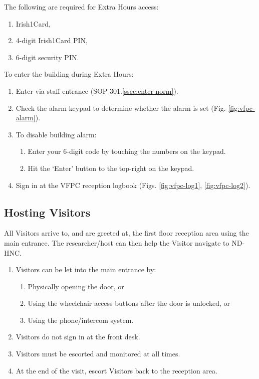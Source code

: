 \documentclass[11pt]{article}
\begin{document}
The following are required for Extra Hours access:

\begin{enumerate}
	\item Irish1Card,
	\item 4-digit Irish1Card PIN,
	\item 6-digit security PIN.
\end{enumerate}


To enter the building during Extra Hours:

\begin{enumerate}
    \item Enter via staff entrance (SOP 301.\ref{ssec:enter-norm}).
    \item Check the alarm keypad to determine whether the alarm is set (Fig. \ref{fig:vfpc-alarm}).
    \item To disable building alarm:
    \begin{enumerate}
        \item Enter your 6-digit code by touching the numbers on the keypad.
        \item Hit the `Enter' button to the top-right on the keypad.
    \end{enumerate}
    \item Sign in at the VFPC reception logbook (Figs. \ref{fig:vfpc-log1}, \ref{fig:vfpc-log2}).
\end{enumerate}


\subsection{Hosting Visitors}
\label{ssec:host-visit}

All Visitors arrive to, and are greeted at, the first floor reception area using the main entrance. The researcher/host can then help the Visitor navigate to ND-HNC.

\begin{enumerate}
	\item Visitors can be let into the main entrance by:
	\begin{enumerate}
        \item Physically opening the door, or
        \item Using the wheelchair access buttons after the door is unlocked, or
        \item Using the phone/intercom system.
    \end{enumerate}
    \item Visitors do not sign in at the front desk.
    \item Visitors must be escorted and monitored at all times.
    \item At the end of the visit, escort Visitors back to the reception area.
\end{enumerate}
\end{document}

